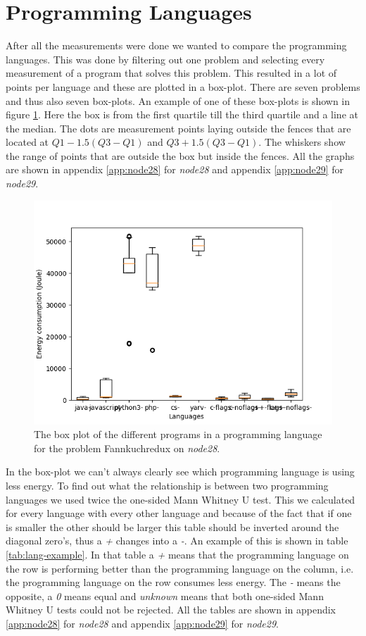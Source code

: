 \section{Programming Languages}
After all the measurements were done we wanted to compare the programming languages. This was done by filtering out one problem and selecting every measurement of a program that solves this problem. This resulted in a lot of points per language and these are plotted in a box-plot. There are seven problems and thus also seven box-plots. An example of one of these box-plots is shown in figure \ref{fig:box-example}. Here the box is from the first quartile till the third quartile and a line at the median. The dots are measurement points laying outside the fences that are located at $Q1 - 1.5(Q3-Q1)$ and $Q3 + 1.5(Q3-Q1)$. The whiskers show the range of points that are outside the box but inside the fences. All the graphs are shown in appendix \ref{app:node28} for \textit{node28} and appendix \ref{app:node29} for \textit{node29}.\\

\begin{figure}[h]
    \centering
    \includegraphics[width=.6\textwidth]{graphs/fannkuchredux_BOXoverview3.png}
    \caption{The box plot of the different programs in a programming language for the problem Fannkuchredux on \textit{node28}.}
    \label{fig:box-example}
\end{figure}

In the box-plot we can't always clearly see which programming language is using less energy. To find out what the relationship is between two programming languages we used twice the one-sided Mann Whitney U test. This we calculated for every language with every other language and because of the fact that if one is smaller the other should be larger this table should be inverted around the diagonal zero's, thus a \textit{+} changes into a \textit{-}. An example of this is shown in table \ref{tab:lang-example}. In that table a \textit{+} means that the programming language on the row is performing better than the programming language on the column, i.e. the programming language on the row consumes less energy. The \textit{-} means the opposite, a \textit{0} means equal and \textit{unknown} means that both one-sided Mann Whitney U tests could not be rejected. All the tables are shown in appendix \ref{app:node28} for \textit{node28} and appendix \ref{app:node29} for \textit{node29}.\\

